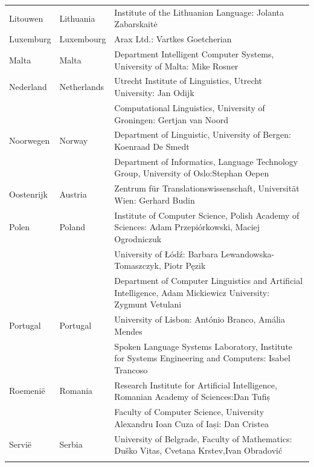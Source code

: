 \documentclass[]{../../metanetpaper}
\begin{document}
\begin{longtable}{@{}llp{113mm}@{}}
  Litouwen & \textcolor{grey1}{Lithuania} & Institute of the Lithuanian Language: Jolanta Zabarskaitė\\ \addlinespace
  Luxemburg & \textcolor{grey1}{Luxembourg} & Arax Ltd.: Vartkes Goetcherian\\ \addlinespace
  Malta & \textcolor{grey1}{Malta} & Department Intelligent Computer Systems, University of Malta: Mike Rosner\\ \addlinespace
  Nederland & \textcolor{grey1}{Netherlands} & Utrecht Institute of Linguistics, Utrecht University: Jan Odijk\\ \addlinespace
  & & Computational Linguistics, University of Groningen: Gertjan van Noord\\ \addlinespace
  Noorwegen & \textcolor{grey1}{Norway} & Department of Linguistic, University of Bergen: Koenraad De Smedt\\ \addlinespace
  & & Department of Informatics, Language Technology Group, University of Oslo:\newline Stephan Oepen \\ \addlinespace
  Oostenrijk& \textcolor{grey1}{Austria} & Zentrum für Translationswissenschaft, Universität Wien: Gerhard Budin\\ \addlinespace
  Polen & \textcolor{grey1}{Poland} & Institute of Computer Science, Polish Academy of Sciences: Adam Przepiórkowski, Maciej Ogrodniczuk \\ \addlinespace
  & & University of Łódź: Barbara Lewandowska-Tomaszczyk, Piotr Pęzik\\ \addlinespace
  & & Department of Computer Linguistics and Artificial Intelligence, Adam Mickiewicz University: Zygmunt Vetulani \\ \addlinespace
  Portugal & \textcolor{grey1}{Portugal} & University of Lisbon: António Branco, Amália Mendes \\ \addlinespace
  & & Spoken Language Systems Laboratory, Institute for Systems Engineering and Computers: Isabel Trancoso \\ \addlinespace
  Roemeni{\"e} & \textcolor{grey1}{Romania} & Research Institute for Artificial Intelligence, Romanian Academy of Sciences:\newline Dan Tufiș \\ \addlinespace
  & & Faculty of Computer Science, University Alexandru Ioan Cuza of Iași: Dan Cristea  \\ \addlinespace
  Servi{\"e} & \textcolor{grey1}{Serbia} & University of Belgrade, Faculty of Mathematics: Duško Vitas, Cvetana Krstev,\newline Ivan Obradović \\ \addlinespace

\end{longtable}
\end{document}
